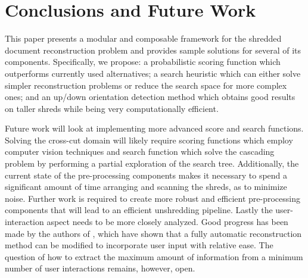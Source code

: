 \documentclass{llncs}
\begin{document}
\section{Conclusions and Future Work}
This paper presents a modular and composable framework for the shredded document reconstruction problem and provides sample solutions for several of its components. Specifically, we propose: a probabilistic scoring function which outperforms currently used alternatives; a search heuristic which can either solve simpler reconstruction problems or reduce the search space for more complex ones; and an up/down orientation detection method which obtains good results on taller shreds while being very computationally efficient.

Future work will look at implementing more advanced score and search functions. Solving the cross-cut domain will likely require scoring functions which employ computer vision techniques and search function which solve the cascading problem by performing a partial exploration of the search tree. Additionally, the current state of the pre-processing components makes it necessary to spend a significant amount of time arranging and scanning the shreds, as to minimize noise. Further work is required to create more robust and efficient pre-processing components that will lead to an efficient unshredding pipeline. Lastly the user-interaction aspect needs to be more closely analyzed. Good progress has been made by the authors of \cite{P1,P5}, which have shown that a fully automatic reconstruction method can be modified to incorporate user input with relative ease. The question of how to extract the maximum amount of information from a minimum number of user interactions remains, however, open.



\end{document}

